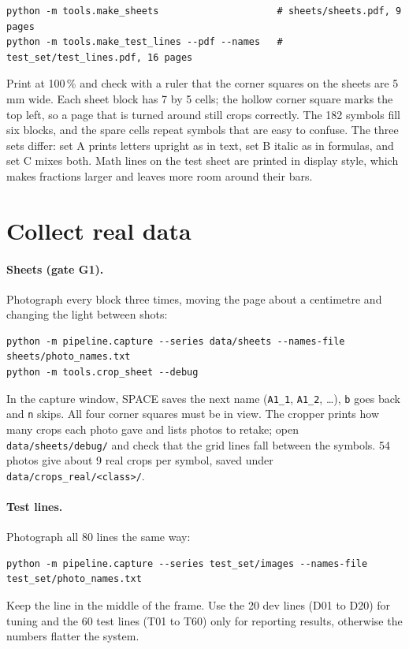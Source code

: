 \documentclass[11pt]{article}
\newcommand{\cmd}[1]{\texttt{#1}}
\begin{document}
\begin{lstlisting}
python -m tools.make_sheets                     # sheets/sheets.pdf, 9 pages
python -m tools.make_test_lines --pdf --names   # test_set/test_lines.pdf, 16 pages
\end{lstlisting}

Print at 100\,\% and check with a ruler that the corner squares on the sheets are 5\,mm wide.
Each sheet block has 7 by 5 cells; the hollow corner square marks the top left, so a page that
is turned around still crops correctly. The 182 symbols fill six blocks, and the spare cells
repeat symbols that are easy to confuse. The three sets differ: set A prints letters upright as in
text, set B italic as in formulas, and set C mixes both. Math lines on the test sheet are printed
in display style, which makes fractions larger and leaves more room around their bars.

\section{Collect real data}
\label{sec:data}

\paragraph{Sheets (gate G1).} Photograph every block three times, moving the page about a
centimetre and changing the light between shots:
\begin{lstlisting}
python -m pipeline.capture --series data/sheets --names-file sheets/photo_names.txt
python -m tools.crop_sheet --debug
\end{lstlisting}
In the capture window, SPACE saves the next name (\cmd{A1\_1}, \cmd{A1\_2}, \ldots), \cmd{b} goes
back and \cmd{n} skips. All four corner squares must be in view. The cropper prints how many crops
each photo gave and lists photos to retake; open \cmd{data/sheets/debug/} and check that the grid
lines fall between the symbols. 54 photos give about 9 real crops per symbol, saved under
\cmd{data/crops\_real/<class>/}.

\paragraph{Test lines.} Photograph all 80 lines the same way:
\begin{lstlisting}
python -m pipeline.capture --series test_set/images --names-file test_set/photo_names.txt
\end{lstlisting}
Keep the line in the middle of the frame. Use the 20 dev lines (D01 to D20) for tuning and the 60
test lines (T01 to T60) only for reporting results, otherwise the numbers flatter the system.
\end{document}
